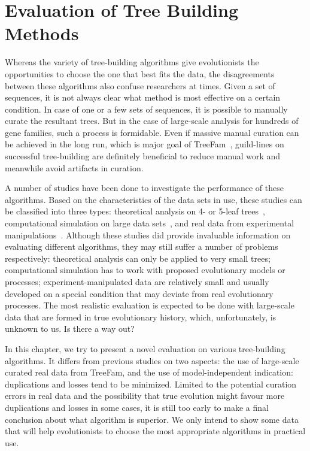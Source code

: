 \chapter{Evaluation of Tree Building Methods}\label{chap:benchmark}

Whereas the variety of tree-building algorithms give evolutionists the opportunities
to choose the one that best fits the data, the disagreements between these
algorithms also confuse researchers at times. Given a set of sequences, it is not
always clear what method is most effective on a certain condition. In case
of one or a few sets of sequences, it is possible to manually curate the resultant trees.
But in the case of large-scale analysis for hundreds of gene families, such a process is formidable.
Even if massive manual curation can be achieved in the long run, which is major goal of TreeFam~\cite{li06},
guild-lines on successful tree-building are definitely beneficial to reduce manual work and
meanwhile avoid artifacts in curation.

A number of studies have been done to investigate the performance of these algorithms.
Based on the characteristics of the data sets in use, these studies can be classified into
three types: theoretical analysis on 4- or 5-leaf trees~\cite{gaut95,huelsenbeck95,yang96}, computational simulation
on large data sets~\cite{kuhner94,hall05,hollich05}, and real data from experimental manipulations~\cite{hillis92,hillis94,bull97}.
Although these studies did provide invaluable information on evaluating different algorithms, they
may still suffer a number of problems respectively: theoretical analysis can only
be applied to very small trees; computational simulation has to work with proposed evolutionary models or processes;
experiment-manipulated data are relatively small and usually developed on a special condition
that may deviate from real evolutionary processes. The most realistic evaluation is expected
to be done with large-scale data that are formed in true evolutionary history, which,
unfortunately, is unknown to us. Is there a way out?

In this chapter, we try to present a novel evaluation on various tree-building algorithms.
It differs from previous studies on two aspects: the use of large-scale curated
real data from TreeFam, and the use of model-independent indication:
duplications and losses tend to be minimized. Limited to the potential curation errors in real data and
the possibility that true evolution might favour more duplications and losses in some cases,
it is still too early to make a final conclusion about what algorithm is superior.
We only intend to show some data that will help evolutionists
to choose the most appropriate algorithms in practical use.

